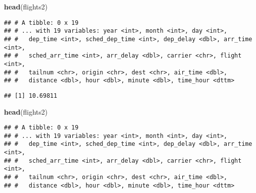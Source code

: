 \documentclass[]{article}
\newenvironment{Shaded}{\begin{snugshade}}{\end{snugshade}}
\newcommand{\KeywordTok}[1]{\textcolor[rgb]{0.13,0.29,0.53}{\textbf{#1}}}
\newcommand{\DataTypeTok}[1]{\textcolor[rgb]{0.13,0.29,0.53}{#1}}
\newcommand{\StringTok}[1]{\textcolor[rgb]{0.31,0.60,0.02}{#1}}
\newcommand{\OtherTok}[1]{\textcolor[rgb]{0.56,0.35,0.01}{#1}}
\newcommand{\OperatorTok}[1]{\textcolor[rgb]{0.81,0.36,0.00}{\textbf{#1}}}
\newcommand{\NormalTok}[1]{#1}
\begin{document}
\begin{Shaded}
\begin{Highlighting}[]
\KeywordTok{head}\NormalTok{(flights2)}
\end{Highlighting}
\end{Shaded}

\begin{verbatim}
## # A tibble: 0 x 19
## # ... with 19 variables: year <int>, month <int>, day <int>,
## #   dep_time <int>, sched_dep_time <int>, dep_delay <dbl>, arr_time <int>,
## #   sched_arr_time <int>, arr_delay <dbl>, carrier <chr>, flight <int>,
## #   tailnum <chr>, origin <chr>, dest <chr>, air_time <dbl>,
## #   distance <dbl>, hour <dbl>, minute <dbl>, time_hour <dttm>
\end{verbatim}

\begin{Shaded}
\end{Shaded}

\begin{verbatim}
## [1] 10.69811
\end{verbatim}

\begin{Shaded}
\begin{Highlighting}[]
\KeywordTok{head}\NormalTok{(flights2)}
\end{Highlighting}
\end{Shaded}

\begin{verbatim}
## # A tibble: 0 x 19
## # ... with 19 variables: year <int>, month <int>, day <int>,
## #   dep_time <int>, sched_dep_time <int>, dep_delay <dbl>, arr_time <int>,
## #   sched_arr_time <int>, arr_delay <dbl>, carrier <chr>, flight <int>,
## #   tailnum <chr>, origin <chr>, dest <chr>, air_time <dbl>,
## #   distance <dbl>, hour <dbl>, minute <dbl>, time_hour <dttm>
\end{verbatim}

\begin{Shaded}
\end{Shaded}
\end{document}
